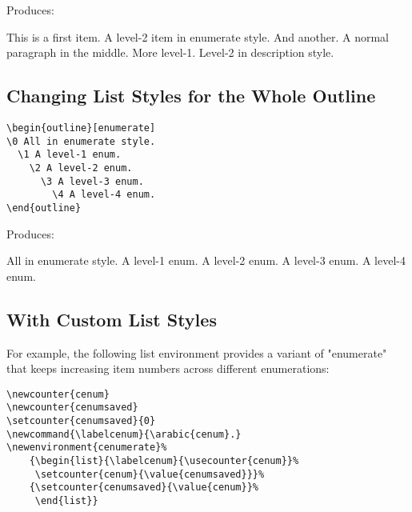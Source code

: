 \documentclass[11pt]{article}
\begin{document}
\noindent Produces:

{\small
\renewcommand{\outlineii}{enumerate}
\begin{outline}
  \1 This is a first item.  
    \2 A level-2 item in enumerate style.
    \2 And another.
\0 A normal paragraph in the middle.
\renewcommand{\outlineii}{description}
  \1 More level-1.
    \2[Descr] Level-2 in description style.
\end{outline}
}

\subsection{Changing List Styles for the Whole Outline}

{\small\begin{verbatim}
\begin{outline}[enumerate]
\0 All in enumerate style.
  \1 A level-1 enum.
    \2 A level-2 enum.
      \3 A level-3 enum.
        \4 A level-4 enum.
\end{outline}
\end{verbatim}}

\noindent Produces:

{\small
\begin{outline}[enumerate]
\0 All in enumerate style.
  \1 A level-1 enum.
    \2 A level-2 enum.
      \3 A level-3 enum.
        \4 A level-4 enum.
\end{outline}
}

\subsection{With Custom List Styles}

\noindent For example, the following list environment provides a variant of "enumerate" that keeps increasing item numbers across different enumerations:

{\small\begin{verbatim}
\newcounter{cenum}
\newcounter{cenumsaved}
\setcounter{cenumsaved}{0}
\newcommand{\labelcenum}{\arabic{cenum}.}
\newenvironment{cenumerate}%
	{\begin{list}{\labelcenum}{\usecounter{cenum}}%
	 \setcounter{cenum}{\value{cenumsaved}}}%
	{\setcounter{cenumsaved}{\value{cenum}}%
	 \end{list}}
\end{verbatim}}

\setcounter{cenumsaved}{0}
\newcommand{\labelcenum}{\arabic{cenum}.}
\newenvironment{cenumerate}%
	{\begin{list}{\labelcenum}{\usecounter{cenum}}%
	 \setcounter{cenum}{\value{cenumsaved}}}%
	{\setcounter{cenumsaved}{\value{cenum}}%
	 \end{list}}
\end{document}
